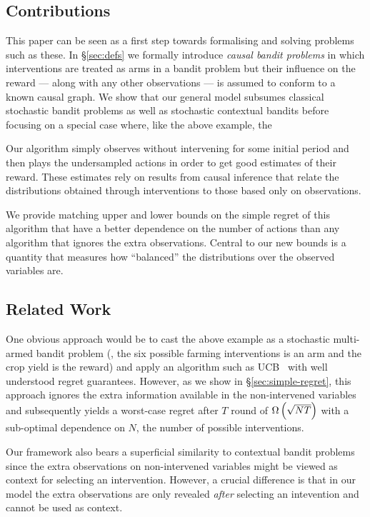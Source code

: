 \subsection{Contributions}

This paper can be seen as a first step towards formalising and solving problems such as these. 
In \S\ref{sec:defs} we formally introduce \emph{causal bandit problems} in which interventions are treated as arms in a bandit problem but their influence on the reward --- along with any other observations --- is assumed to conform to a known causal graph. 
We show that our general model subsumes classical stochastic bandit problems as well as stochastic contextual bandits before focusing on a special case where, like the above example, the 

Our algorithm simply observes without intervening for some initial period and then plays the undersampled actions in order to get good estimates of their reward. 
These estimates rely on results from causal inference that relate the distributions obtained through interventions to those based only on observations.

We provide matching upper and lower bounds on the simple regret of this algorithm that have a better dependence on the number of actions than any algorithm that ignores the extra observations. 
Central to our new bounds is a quantity that measures how ``balanced'' the distributions over the observed variables are.

\subsection{Related Work}

One obvious approach would be to cast the above example as a stochastic multi-armed bandit problem (\eg, the six possible farming interventions is an arm and the crop yield is the reward) and apply an algorithm such as UCB~\cite{Auer1995} with well understood regret guarantees.
However, as we show in \S\ref{sec:simple-regret}, this approach ignores the extra information available in the non-intervened variables and subsequently yields a worst-case regret after $T$ round of $\Omega\left( \sqrt{NT} \right)$ with a sub-optimal dependence on $N$, the number of possible interventions.


Our framework also bears a superficial similarity to contextual bandit problems \cite{Langford2008,Agarwal2014} since the extra observations on non-intervened variables might be viewed as context for selecting an intervention. However, a crucial difference is that in our model the extra observations are only revealed \emph{after} selecting an intevention and cannot be used as context.


